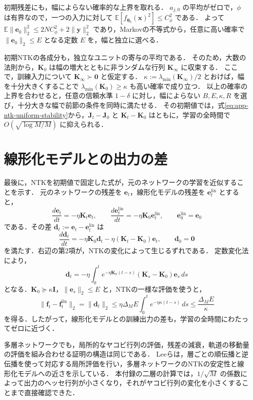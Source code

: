 \documentclass[../main.tex]{subfiles}
\begin{document}
初期残差にも，幅によらない確率的な上界を取れる．
$a_{j,0}$ の平均がゼロで，$\phi$ は有界なので，一つの入力に対して
$\mathbb{E}[f_{\bm{\theta}_0}(\bm{x})^2]\leq C_\phi^2$ である．
よって $\mathbb{E}\|\bm{e}_0\|_2^2\leq2NC_\phi^2+2\|\bm{y}\|_2^2$ であり，Markovの不等式から，任意に高い確率で $\|\bm{e}_0\|_2\leq E$ となる定数 $E$ を，幅と独立に選べる．

初期NTKの各成分も，独立なユニットの寄与の平均である．
そのため，大数の法則から，$\bm{K}_0$ は幅の増大とともに非ランダムな行列 $\bm{K}_\infty$ に収束する．
ここで，訓練入力について $\bm{K}_\infty\succ\bm{0}$ と仮定する\cite{jacot2018ntk,lee2019wide}．
$\kappa:=\lambda_{\min}(\bm{K}_\infty)/2$ とおけば，幅を十分大きくすることで $\lambda_{\min}(\bm{K}_0)\geq\kappa$ も高い確率で成り立つ．
以上の確率の上界を合わせると，任意の信頼水準 $1-\delta$ に対し，幅によらない $B,E,\kappa,R$ を選び，十分大きな幅で前節の条件を同時に満たせる．
その初期値では，式\eqref{eq:app-ntk-uniform-stability}から，$\bm{J}_t-\bm{J}_0$ と $\bm{K}_t-\bm{K}_0$ はともに，学習の全時間で $O(\sqrt{\log M/M})$ に抑えられる．

\section{線形化モデルとの出力の差}

最後に，NTKを初期値で固定した式が，元のネットワークの学習を近似することを示す．
元のネットワークの残差を $\bm{e}_t$，線形化モデルの残差を $\bm{e}^{\mathrm{lin}}_t$ とすると，
\begin{equation}
  \frac{d\bm{e}_t}{dt}=-\eta\bm{K}_t\bm{e}_t,
  \qquad
  \frac{d\bm{e}^{\mathrm{lin}}_t}{dt}
  =-\eta\bm{K}_0\bm{e}^{\mathrm{lin}}_t,
  \qquad
  \bm{e}^{\mathrm{lin}}_0=\bm{e}_0
  \label{eq:app-ntk-two-flows}
\end{equation}
である．その差 $\bm{d}_t:=\bm{e}_t-\bm{e}^{\mathrm{lin}}_t$ は
\begin{equation}
  \frac{d\bm{d}_t}{dt}
  =-\eta\bm{K}_0\bm{d}_t
    -\eta(\bm{K}_t-\bm{K}_0)\bm{e}_t,
  \qquad\bm{d}_0=\bm{0}
  \label{eq:app-ntk-error-flow}
\end{equation}
を満たす．右辺の第2項が，NTKの変化によって生じるずれである．
定数変化法により，
\begin{equation}
  \bm{d}_t=-\eta\int_0^t
    e^{-\eta\bm{K}_0(t-s)}
    (\bm{K}_s-\bm{K}_0)\bm{e}_s\,ds
  \label{eq:app-ntk-error-integral}
\end{equation}
となる．$\bm{K}_0\succeq\kappa\bm{I}$，$\|\bm{e}_s\|_2\leq E$ と，NTKの一様な評価を使うと，
\begin{equation}
  \|\bm{f}_t-\bm{f}^{\mathrm{lin}}_t\|_2
  =\|\bm{d}_t\|_2
  \leq\eta\Delta_M E\int_0^t e^{-\eta\kappa(t-s)}\,ds
  \leq\frac{\Delta_M E}{\kappa}
  \label{eq:app-ntk-linearization-bound}
\end{equation}
を得る．したがって，線形化モデルとの訓練出力の差も，学習の全時間にわたってゼロに近づく．

多層ネットワークでも，局所的なヤコビ行列の評価，残差の減衰，軌道の移動量の評価を組み合わせる証明の構造は同じである．
Leeら\cite{lee2019wide}は，層ごとの順伝播と逆伝播を使って対応する局所評価を行い，多層ネットワークのNTKの安定性と線形化モデルへの近さを示している．
本付録の二層の計算では，$1/\sqrt{M}$ の係数によって出力のヘッセ行列が小さくなり，それがヤコビ行列の変化を小さくすることまで直接確認できた．

\chapterbibliography
\end{document}

